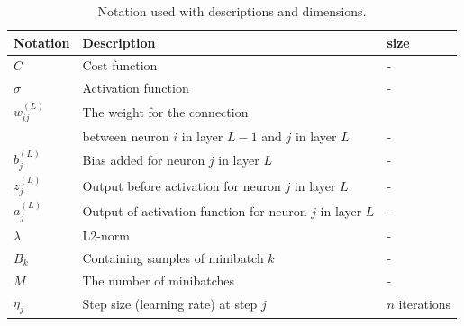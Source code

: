 \documentclass[11pt]{article}
\begin{document}
\begin{table}
    \begin{small}
        \caption{Notation used with descriptions and dimensions. }
        \label{tab:}
        \begin{center}
            \begin{tabular}{|l|l|l|}
                \hline
                Notation       & Description                                               & size                                \\
                \hline
                $C$            & Cost function                                             & -                                   \\
                \hline
                $\sigma$       & Activation function                                       & -                                   \\
                \hline
                $w_{ij}^{(L)}$ & The weight for the connection                             &                                     \\                     & between neuron $i$ in layer $L-1$   and $j$ in layer $L$ & - \\
                \hline
                $b_j^{(L)}$    & Bias added for neuron $j$ in layer $L$                    & -                                   \\
                \hline
                $z_j^{(L)}$    & Output before activation for neuron $j$ in layer $L$      & -                                   \\
                \hline
                $a_j^{(L)}$    & Output of activation function for neuron $j$ in layer $L$ & -                                   \\
                \hline
                $\lambda$      & L2-norm                                                   & -                                   \\
                \hline
                $B_k$          & Containing samples of minibatch $k$                       & -                                   \\
                \hline
                $M$            & The number of minibatches                                 & -                                   \\
                \hline
                $\eta_j$       & Step size (learning rate) at step $j$                     & $n$ iterations                      \\

\end{tabular}
\end{center}
\end{small}
\end{table}
\end{document}
